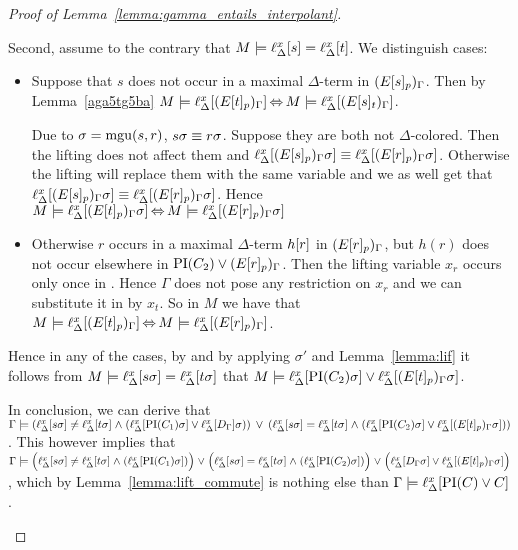 \begin{proof}[Proof of Lemma~\ref{lemma:gamma_entails_interpolant}]
\begin{description}
\begin{enumerate}
						Second, assume to the contrary that $M \models \ell_{\Delta}^{x}[s] = \ell_{\Delta}^{x}[t]$.
						We distinguish cases:
						\begin{itemize}
							\item
								Suppose that $s$ does not occur in a maximal $\Delta$-term in $(E{[s]_{p}})_\Gamma$.
								Then by Lemma~\ref{aga5tg5ba} $M\models \ell_{\Delta}^{x}[(E{[t]_{p}})_\Gamma] \operatorname{\Leftrightarrow} M \models \ell_{\Delta}^{x}[(E{[s]_{t}})_\Gamma]$.

								Due to $\sigma=\operatorname{mgu}(s, r)$, $s\sigma \equiv r\sigma$.
								Suppose they are both not $\Delta$-colored.
								Then the lifting does not affect them and 
								$\ell_{\Delta}^{x}[(E{[s]_{p}})_\Gamma\sigma] \equiv \ell_{\Delta}^{x}[(E{[r]_{p}})_\Gamma\sigma]$.
								Otherwise the lifting will replace them with the same variable and we as well get that
								$\ell_{\Delta}^{x}[(E{[s]_{p}})_\Gamma\sigma] \equiv \ell_{\Delta}^{x}[(E{[r]_{p}})_\Gamma\sigma]$.
								Hence $M\models \ell_{\Delta}^{x}[(E{[t]_{p}})_\Gamma\sigma] \operatorname{\Leftrightarrow}\allowbreak M\models 
								\ell_{\Delta}^{x}[(E{[r]_{p}})_\Gamma\sigma]$

							\item
								Otherwise $r$ occurs in a maximal $\Delta$-term $h[r]$ in $(E{[r]_{p}})_\Gamma$, but $h(r)$ does not occur elsewhere in $\operatorname{PI}(C_2) \lor (E{[r]_{p}})_\Gamma$.
								Then the lifting variable $x_r$ occurs only once in \markB{}.
								Hence $\Gamma$ does not pose any restriction on $x_r$ and we can substitute it in  by $x_t$. 
								So in $M$ we have that $M\models \ell_{\Delta}^{x}[(E{[t]_{p}})_\Gamma] \operatorname{\Leftrightarrow}\allowbreak M\models \ell_{\Delta}^{x}[(E{[r]_{p}})_\Gamma]$.

						\end{itemize}

						Hence in any of the cases, by \markB{} and by applying $\sigma'$ and Lemma~\ref{lemma:lif}
						it follows from $M\models \ell_{\Delta}^{x}[s\sigma] = \ell_{\Delta}^{x}[t\sigma]$ 
						that $M \models \ell_{\Delta}^{x}[\operatorname{PI}(C_2)\sigma] \lor \ell_{\Delta}^{x}[(E{[t]_{p}})_\Gamma\sigma]$. 
						\medskip

						In conclusion, we can derive that 
						$\Gamma \models
						(\ell_{\Delta}^{x}[s\sigma] \neq \ell_{\Delta}^{x}[t\sigma] \;{\land}\;\allowbreak (\ell_{\Delta}^{x}[\operatorname{PI}(C_1)\sigma] \lor \ell_{\Delta}^{x}[D_\Gamma]\sigma))
						\;\,{\lor}\;\,\allowbreak
						(\ell_{\Delta}^{x}[s\sigma] = \ell_{\Delta}^{x}[t\sigma] \;{\land}\; (\ell_{\Delta}^{x}[\operatorname{PI}(C_2)\sigma] \lor \ell_{\Delta}^{x}[(E{[t]_{p}})_\Gamma\sigma]))$.
						This however implies that
						$\Gamma \entails
						\Big(\lifdelta{s\sigma} \neq \lifdelta{t\sigma} \spas\land (\lifdelta{\PI(C_1)\sigma} )\Big)
						\spas{\lor}\allowbreak
						\Big(\lifdelta{s\sigma} =\nolinebreak \lifdelta{t\sigma} \spas\land (\lifdelta{\PI(C_2)\sigma}) \Big)
						\spas\lor\allowbreak \Big(\lifdelta{D_\Gamma\sigma} \lor \lifdelta{(E\occat{t}{p})_\Gamma\sigma}\Big)$, 
					which by Lemma~\ref{lemma:lift_commute} is nothing else than
						$\Gamma \models \ell_{\Delta}^{x}[\operatorname{PI}(C) \lor C]$.


\end{enumerate}
\end{description}
\end{proof}
